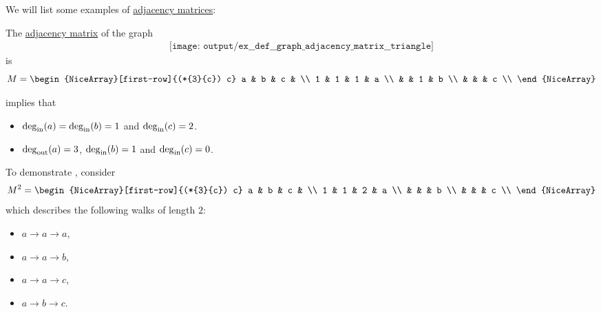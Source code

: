 \begin{example}\label{ex:def:graph_adjacency_matrix}
  We will list some examples of \hyperref[def:graph_adjacency_matrix]{adjacency matrices}:
  \begin{thmenum}
     The \hyperref[def:graph_adjacency_matrix]{adjacency matrix} of the graph
    \begin{equation}\label{eq:ex:def:graph_adjacency_matrix/triangle/graph}
      \begin{aligned}
        \texttt{[image: output/ex\_\_def\_\_graph\_adjacency\_matrix\_\_triangle]}
      \end{aligned}
    \end{equation}
    is
    \begin{equation}\label{eq:ex:def:graph_adjacency_matrix/triangle/graph/matrix}
      M =
      \begin{NiceArray}[first-row]{(*{3}{c}) c}
        a & b & c &   \\
        1 & 1 & 1 & a \\
          &   & 1 & b \\
          &   &   & c \\
      \end{NiceArray}
    \end{equation}

     implies that
    \begin{itemize}
      \item \( \deg_{\op{in}}(a) = \deg_{\op{in}}(b) = 1 \) and \( \deg_{\op{in}}(c) = 2 \).
      \item \( \deg_{\op{out}}(a) = 3 \), \( \deg_{\op{in}}(b) = 1 \) and \( \deg_{\op{in}}(c) = 0 \).
    \end{itemize}

    To demonstrate , consider
    \begin{equation*}
      M^2 =
      \begin{NiceArray}[first-row]{(*{3}{c}) c}
        a & b & c &   \\
        1 & 1 & 2 & a \\
          &   &   & b \\
          &   &   & c \\
      \end{NiceArray}
    \end{equation*}
    which describes the following walks of length \( 2 \):
    \begin{itemize}
      \item \( a \to a \to a \),
      \item \( a \to a \to b \),
      \item \( a \to a \to c \),
      \item \( a \to b \to c \).
    \end{itemize}


\end{thmenum}
\end{example}
